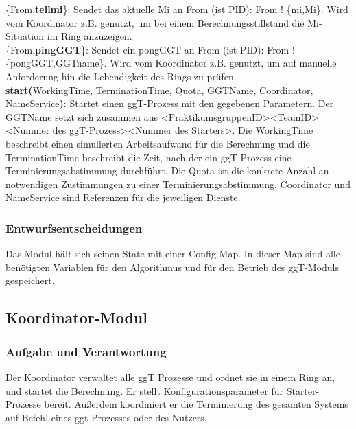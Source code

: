 \documentclass{article}
\begin{document}
\{From,\textbf{tellmi}\}: Sendet das aktuelle Mi an From (ist PID): From ! \{mi,Mi\}. Wird vom Koordinator z.B. genutzt,
um bei einem Berechnungsstillstand die Mi-Situation im Ring anzuzeigen.\\

\{From,\textbf{pingGGT}\}: Sendet ein pongGGT an From (ist PID): From ! \{pongGGT,GGTname\}. Wird vom Koordinator z.B.
genutzt, um auf manuelle Anforderung hin die Lebendigkeit des Rings zu prüfen.\\


\textbf{start(}WorkingTime, TerminationTime, Quota, GGTName, Coordinator, NameService\textbf{)}: Startet einen
ggT-Prozess mit den gegebenen Parametern. Der GGTName setzt sich zusammen aus <PraktikumsgruppenID><TeamID><Nummer des ggT-Prozess><Nummer des Starters>.
Die WorkingTime beschreibt einen simulierten Arbeitsaufwand für die Berechnung und die TerminationTime beschreibt die
Zeit, nach der ein ggT-Prozess eine Terminierungsabstimmung durchführt. Die Quota ist die konkrete Anzahl an
notwendigen Zustimmungen zu einer Terminierungsabstimmung. Coordinator und NameService sind Referenzen für die
jeweiligen Dienste.\\

\subsubsection{Entwurfsentscheidungen}
Das Modul hält sich seinen State mit einer Config-Map. In dieser Map sind alle benötigten Variablen für den Algorithmus
und für den Betrieb des ggT-Moduls gespeichert.

\newpage

\subsection{Koordinator-Modul}
\subsubsection{Aufgabe und Verantwortung}
Der Koordinator verwaltet alle ggT Prozesse und ordnet sie in einem Ring an, und startet die Berechnung.
Er stellt Konfigurationsparameter für Starter-Prozesse bereit. Außerdem koordiniert er die Terminierung des
gesamten Systems auf Befehl eines ggt-Prozesses oder des Nutzers.
\end{document}
